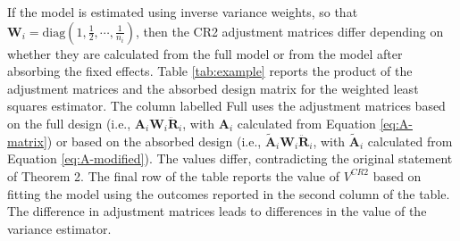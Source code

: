 \documentclass[12pt]{article}
\begin{document}
If the model is estimated using inverse variance weights, so that
\(\mathbf{W}_i = \text{diag}\left(1, \frac{1}{2}, \cdots, \frac{1}{n_i}\right)\),
then the CR2 adjustment matrices differ depending on whether they are
calculated from the full model or from the model after absorbing the
fixed effects. Table \ref{tab:example} reports the product of the
adjustment matrices and the absorbed design matrix for the weighted
least squares estimator. The column labelled Full uses the adjustment
matrices based on the full design (i.e.,
\(\mathbf{A}_i \mathbf{W}_i \mathbf{\ddot{R}}_i\), with \(\mathbf{A}_i\)
calculated from Equation \ref{eq:A-matrix}) or based on the absorbed
design (i.e., \(\mathbf{\tilde{A}}_i \mathbf{W}_i \mathbf{\ddot{R}}_i\),
with \(\mathbf{\tilde{A}}_i\) calculated from Equation
\ref{eq:A-modified}). The values differ, contradicting the original
statement of Theorem 2. The final row of the table reports the value of
\(V^{CR2}\) based on fitting the model using the outcomes reported in
the second column of the table. The difference in adjustment matrices
leads to differences in the value of the variance estimator.
\end{document}
